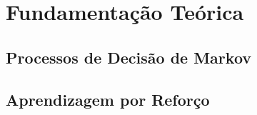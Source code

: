 
\chapter{Fundamentação Teórica\label{chap:FundamentacaoMatematica}}



\section{Processos de Decisão de Markov}

\section{Aprendizagem por Reforço}

 